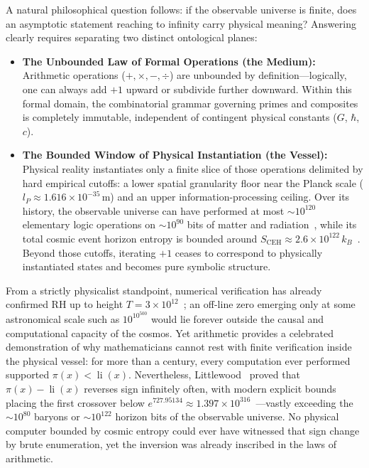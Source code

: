 \documentclass[11pt,a4paper]{article}
\begin{document}
A natural philosophical question follows: if the observable universe is finite, does an asymptotic statement reaching to infinity carry physical meaning? Answering clearly requires separating two distinct ontological planes:
\begin{itemize}
  \item \textbf{The Unbounded Law of Formal Operations (the Medium):} Arithmetic operations ($+, \times, -, \div$) are unbounded by definition---logically, one can always add $+1$ upward or subdivide further downward. Within this formal domain, the combinatorial grammar governing primes and composites is completely immutable, independent of contingent physical constants ($G$, $\hbar$, $c$).
  \item \textbf{The Bounded Window of Physical Instantiation (the Vessel):} Physical reality instantiates only a finite slice of those operations delimited by hard empirical cutoffs: a lower spatial granularity floor near the Planck scale ($l_P \approx 1.616 \times 10^{-35}\,\mathrm{m}$) and an upper information-processing ceiling. Over its history, the observable universe can have performed at most $\sim 10^{120}$ elementary logic operations on $\sim 10^{90}$ bits of matter and radiation~\cite{lloyd2002}, while its total cosmic event horizon entropy is bounded around $S_{\mathrm{CEH}} \approx 2.6 \times 10^{122}\,k_B$~\cite{bekenstein1981,egan2010}. Beyond those cutoffs, iterating $+1$ ceases to correspond to physically instantiated states and becomes pure symbolic structure.
\end{itemize}

From a strictly physicalist standpoint, numerical verification has already confirmed RH up to height $T = 3 \times 10^{12}$~\cite{platt2021}; an off-line zero emerging only at some astronomical scale such as $10^{10^{500}}$ would lie forever outside the causal and computational capacity of the cosmos. Yet arithmetic provides a celebrated demonstration of why mathematicians cannot rest with finite verification inside the physical vessel: for more than a century, every computation ever performed supported $\pi(x) < \operatorname{li}(x)$. Nevertheless, Littlewood~\cite{littlewood1914} proved that $\pi(x) - \operatorname{li}(x)$ reverses sign infinitely often, with modern explicit bounds placing the first crossover below $e^{727.95134} \approx 1.397 \times 10^{316}$~\cite{saouter2015}---vastly exceeding the $\sim 10^{80}$ baryons or $\sim 10^{122}$ horizon bits of the observable universe. No physical computer bounded by cosmic entropy could ever have witnessed that sign change by brute enumeration, yet the inversion was already inscribed in the laws of arithmetic.
\end{document}
